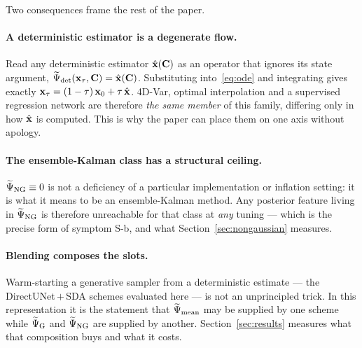 Two consequences frame the rest of the paper.

\paragraph{A deterministic estimator is a degenerate flow.}
Read any deterministic estimator $\hat{\mathbf{x}}(\mathbf{C})$ as an operator that ignores its
state argument, $\widetilde{\Psi}_{\det}(\mathbf{x}_\tau,\mathbf{C}) = \hat{\mathbf{x}}(\mathbf{C})$. Substituting
into~\eqref{eq:ode} and integrating gives exactly
$\mathbf{x}_\tau = (1-\tau)\,\mathbf{x}_0 + \tau\,\hat{\mathbf{x}}$. 4D-Var, optimal interpolation and
a supervised regression network are therefore \emph{the same member} of this
family, differing only in how $\hat{\mathbf{x}}$ is computed. This is why the paper can
place them on one axis without apology.

\paragraph{The ensemble-Kalman class has a structural ceiling.}
$\widetilde{\Psi}_{\mathrm{NG}} \equiv 0$ is not a deficiency of a particular implementation or
inflation setting: it is what it means to be an ensemble-Kalman method. Any
posterior feature living in $\widetilde{\Psi}_{\mathrm{NG}}$ is therefore unreachable for that class at
\emph{any} tuning --- which is the precise form of symptom S-b, and what
Section~\ref{sec:nongaussian} measures.

\paragraph{Blending composes the slots.}
Warm-starting a generative sampler from a deterministic estimate --- the
DirectUNet\,$+$\,SDA schemes evaluated here --- is not an unprincipled trick. In
this representation it is the statement that $\widetilde{\Psi}_{\mathrm{mean}}$ may be supplied by one
scheme while $\widetilde{\Psi}_{\mathrm{G}}$ and $\widetilde{\Psi}_{\mathrm{NG}}$ are supplied by another. Section~\ref{sec:results}
measures what that composition buys and what it costs.
